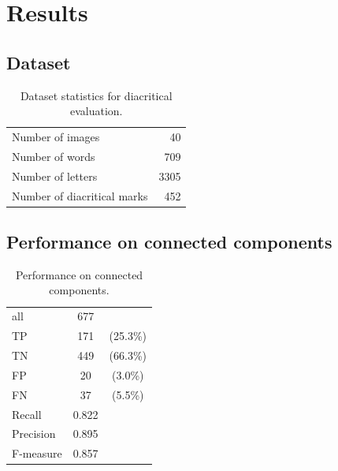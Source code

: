 \documentclass[12pt,a4paper]{report}
\begin{document}
\section{Results}
\subsection{Dataset}
\begin{table}[htbp]
    \centering
    \begin{tabular}{lr}
        \toprule
        Number of images & 40 \\
        Number of words & 709 \\
        Number of letters & 3305 \\
        Number of diacritical marks & 452 \\
        \bottomrule
    \end{tabular}
    \caption{Dataset statistics for diacritical evaluation.}
    \label{tab:diacritic-dataset}
\end{table}

\subsection{Performance on connected components}
\begin{table}[htbp]
    \centering
    \begin{tabular}{lcc}
        \toprule
        all & 677 & \\
        TP & 171 & (25.3\%) \\
        TN & 449 & (66.3\%) \\
        FP & 20 & (3.0\%) \\
        FN & 37 & (5.5\%) \\
        \midrule
        Recall & 0.822 & \\
        Precision & 0.895 & \\
        F-measure & 0.857 & \\
        \bottomrule
    \end{tabular}
    \caption{Performance on connected components.}
    \label{tab:diacritic-cc}
\end{table}
\end{document}
